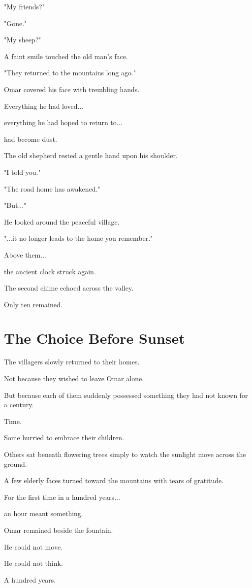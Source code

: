 \documentclass[12pt,openany]{book}
\begin{document}
"My friends?"

"Gone."

"My sheep?"

A faint smile touched the old man's face.

"They returned to the mountains long ago."

Omar covered his face with trembling hands.

Everything he had loved...

everything he had hoped to return to...

had become dust.

The old shepherd rested a gentle hand upon his shoulder.

"I told you."

"The road home has awakened."

"But..."

He looked around the peaceful village.

"...it no longer leads to the home you remember."

Above them...

the ancient clock struck again.

The second chime echoed across the valley.

Only ten remained.
\section*{The Choice Before Sunset}

The villagers slowly returned to their homes.

Not because they wished to leave Omar alone.

But because each of them suddenly possessed something they had not known for a century.

Time.

Some hurried to embrace their children.

Others sat beneath flowering trees simply to watch the sunlight move across the ground.

A few elderly faces turned toward the mountains with tears of gratitude.

For the first time in a hundred years...

an hour meant something.

Omar remained beside the fountain.

He could not move.

He could not think.

A hundred years.
\end{document}
